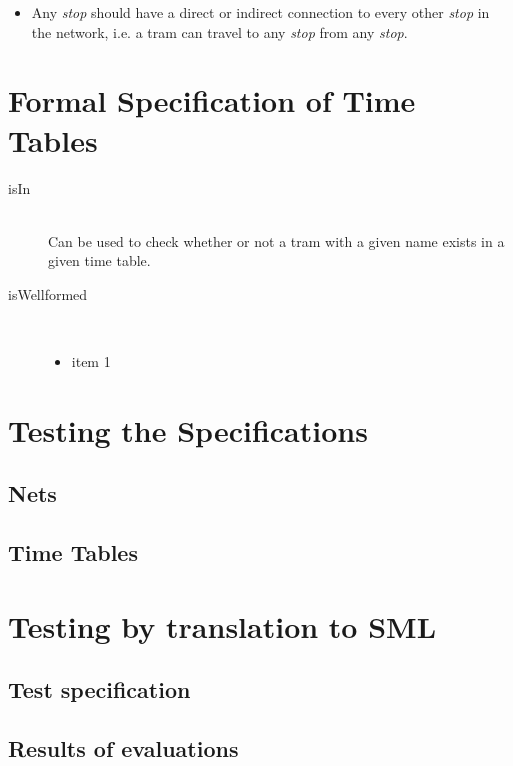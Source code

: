 \documentclass[a4]{article}
\begin{document}
\begin{description}
\begin{itemize}
            \item Any \emph{stop} should have a direct or indirect connection to every other \emph{stop} in the network, i.e. a tram can travel to any \emph{stop} from any \emph{stop}.
        \end{itemize}
\end{description}

\section{Formal Specification of Time Tables}



\begin{description}
    \item[isIn] \hfill \\ Can be used to check whether or not a tram with a given name exists in a given time table.
    \item[isWellformed] \hfill \\ 
        \begin{itemize}
            \item item 1
        \end{itemize}
\end{description}

\section{Testing the Specifications}

\subsection{Nets}



\subsection{Time Tables}



\section{Testing by translation to SML}

\subsection{Test specification}

\subsection{Results of evaluations}
\end{document}

